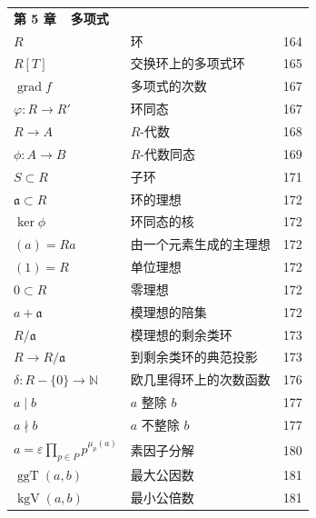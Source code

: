 \begin{longtable}{@{}l l r}
\multicolumn{3}{l}{\textbf{第 5 章\ \ 多项式}} \\[2pt]
$R$ & 环 & 164 \\
$R[T]$ & 交换环上的多项式环 & 165 \\
$\operatorname{grad} f$ & 多项式的次数 & 167 \\
$\varphi \colon R \longrightarrow R'$ & 环同态 & 167 \\
$R \longrightarrow A$ & $R$-代数 & 168 \\
$\phi \colon A \longrightarrow B$ & $R$-代数同态 & 169 \\
$S \subset R$ & 子环 & 171 \\
$\mathfrak{a} \subset R$ & 环的理想 & 172 \\
$\ker \phi$ & 环同态的核 & 172 \\
$(a) = Ra$ & 由一个元素生成的主理想 & 172 \\
$(1) = R$ & 单位理想 & 172 \\
$0 \subset R$ & 零理想 & 172 \\
$a + \mathfrak{a}$ & 模理想的陪集 & 172 \\
$R / \mathfrak{a}$ & 模理想的剩余类环 & 173 \\
$R \longrightarrow R / \mathfrak{a}$ & 到剩余类环的典范投影 & 173 \\
$\delta \colon R - \{0\} \longrightarrow \mathbb{N}$ & 欧几里得环上的次数函数 & 176 \\
$a \mid b$ & $a$ 整除 $b$ & 177 \\
$a \nmid b$ & $a$ 不整除 $b$ & 177 \\
$a = \varepsilon \prod_{p \in P} p^{\mu_p(a)}$ & 素因子分解 & 180 \\
$\operatorname{ggT}(a, b)$ & 最大公因数 & 181 \\
$\operatorname{kgV}(a, b)$ & 最小公倍数 & 181 \\
\hline


\end{longtable}
